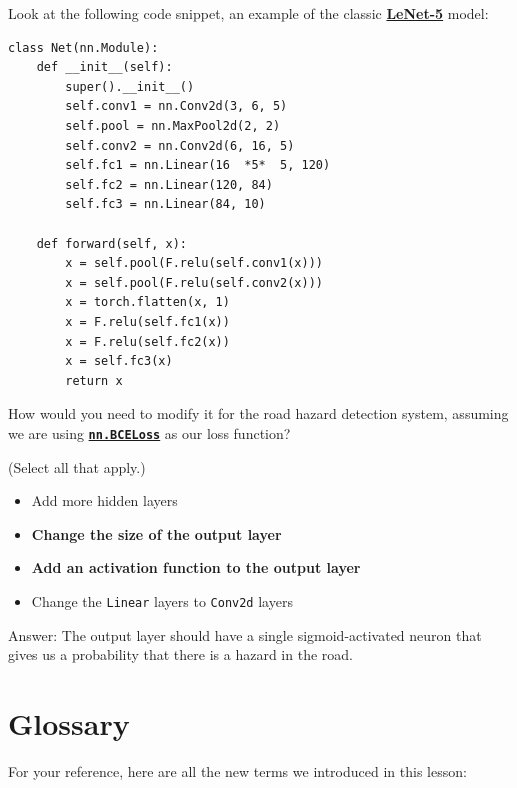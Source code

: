 Look at the following code snippet, an example of the classic \href{https://en.wikipedia.org/wiki/LeNet}{\textbf{LeNet-5}} model:
\begin{lstlisting}
class Net(nn.Module):
    def __init__(self):
        super().__init__()
        self.conv1 = nn.Conv2d(3, 6, 5)
        self.pool = nn.MaxPool2d(2, 2)
        self.conv2 = nn.Conv2d(6, 16, 5)
        self.fc1 = nn.Linear(16  *5*  5, 120)
        self.fc2 = nn.Linear(120, 84)
        self.fc3 = nn.Linear(84, 10)

    def forward(self, x):
        x = self.pool(F.relu(self.conv1(x)))
        x = self.pool(F.relu(self.conv2(x)))
        x = torch.flatten(x, 1) 
        x = F.relu(self.fc1(x))
        x = F.relu(self.fc2(x))
        x = self.fc3(x)
        return x
\end{lstlisting}
How would you need to modify it for the road hazard detection system, assuming we are using \href{https://pytorch.org/docs/stable/generated/torch.nn.BCELoss.html\#torch.nn.BCELoss}{\textbf{\lstinline{nn.BCELoss}}} as our loss function?

(Select all that apply.)
\begin{itemize}
    \item Add more hidden layers
    \item \textbf{Change the size of the output layer}
    \item \textbf{Add an activation function to the output layer}
    \item Change the \lstinline{Linear} layers to \lstinline{Conv2d} layers
\end{itemize}

Answer: The output layer should have a single sigmoid-activated neuron that gives us a probability that there is a hazard in the road.


\section{Glossary}

For your reference, here are all the new terms we introduced in this lesson:

